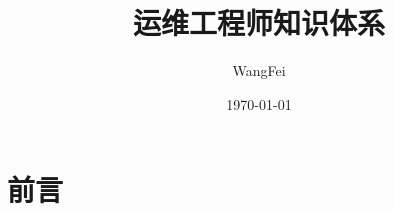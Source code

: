 \documentclass[12pt,UTF8]{ctexbook}
\title{\heiti\zihao{0} 运维工程师知识体系}
\author{WangFei}
\date{\today}
\begin{document}
\maketitle
\tableofcontents

\frontmatter
\chapter{前言}

\mainmatter

%
\end{document}
